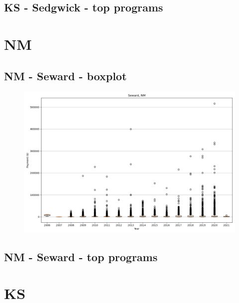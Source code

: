 \subsection*{KS - Sedgwick - top programs}

\newpage
\section*{NM}
\subsection*{NM - Seward - boxplot}
\begin{figure}[h]
\centering
\includegraphics[width=7in]{../output/boxplots/counties/Seward-NM_boxplot.png}
\end{figure}


\subsection*{NM - Seward - top programs}

\newpage
\section*{KS}
